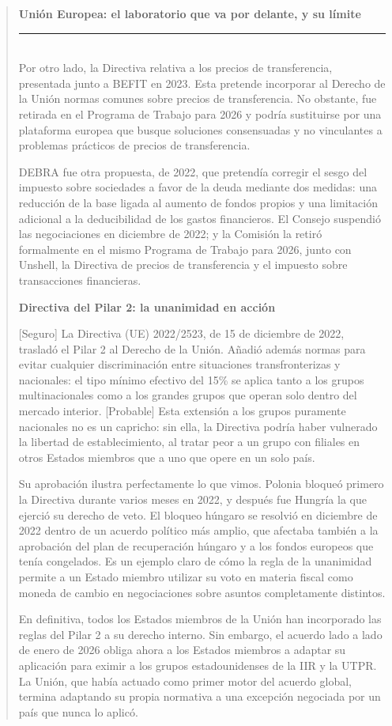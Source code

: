 \documentclass[10pt,a4paper]{article}
\newenvironment{specialblock}[1]{%
      \begin{quote} %
      \small %
      \noindent\textbf{#1}\\[-0.3em] %
      \rule{\linewidth}{0.4pt}\\[0.6em]}{
      \end{quote}}
\begin{document}
\begin{specialblock}{\textbf{Unión Europea}: el laboratorio que va por delante, y su límite}
    Por otro lado, la Directiva relativa a los precios de transferencia, presentada junto a BEFIT en 2023. Esta pretende incorporar al Derecho de la Unión normas comunes sobre precios de transferencia. No obstante, fue retirada en el Programa de Trabajo para 2026 y podría sustituirse por una plataforma europea que busque soluciones consensuadas y no vinculantes a problemas prácticos de precios de transferencia.
    
    DEBRA fue otra propuesta, de 2022, que pretendía corregir el sesgo del impuesto sobre sociedades a favor de la deuda mediante dos medidas: una reducción de la base ligada al aumento de fondos propios y una limitación adicional a la deducibilidad de los gastos financieros. El Consejo suspendió las negociaciones en diciembre de 2022; y la Comisión la retiró formalmente en el mismo Programa de Trabajo para 2026, junto con Unshell, la Directiva de precios de transferencia y el impuesto sobre transacciones financieras.

    
    \textbf{Directiva del Pilar 2: la unanimidad en acción}
    
    [Seguro] La Directiva (UE) 2022/2523, de 15 de diciembre de 2022, trasladó el Pilar 2 al Derecho de la Unión. Añadió además normas para evitar cualquier discriminación entre situaciones transfronterizas y nacionales: el tipo mínimo efectivo del 15\% se aplica tanto a los grupos multinacionales como a los grandes grupos que operan solo dentro del mercado interior. [Probable] Esta extensión a los grupos puramente nacionales no es un capricho: sin ella, la Directiva podría haber vulnerado la libertad de establecimiento, al tratar peor a un grupo con filiales en otros Estados miembros que a uno que opere en un solo país.
    
    Su aprobación ilustra perfectamente lo que vimos. Polonia bloqueó primero la Directiva durante varios meses en 2022, y después fue Hungría la que ejerció su derecho de veto. El bloqueo húngaro se resolvió en diciembre de 2022 dentro de un acuerdo político más amplio, que afectaba también a la aprobación del plan de recuperación húngaro y a los fondos europeos que tenía congelados. Es un ejemplo claro de cómo la regla de la unanimidad permite a un Estado miembro utilizar su voto en materia fiscal como moneda de cambio en negociaciones sobre asuntos completamente distintos.
    
    En definitiva, todos los Estados miembros de la Unión han incorporado las reglas del Pilar 2 a su derecho interno. Sin embargo, el acuerdo lado a lado de enero de 2026 obliga ahora a los Estados miembros a adaptar su aplicación para eximir a los grupos estadounidenses de la IIR y la UTPR. La Unión, que había actuado como primer motor del acuerdo global, termina adaptando su propia normativa a una excepción negociada por un país que nunca lo aplicó.
\end{specialblock}
\end{document}
